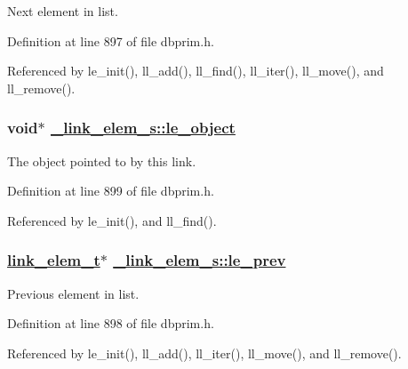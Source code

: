 Next element in list. 

Definition at line 897 of file dbprim.h.

Referenced by le\_\-init(), ll\_\-add(), ll\_\-find(), ll\_\-iter(), ll\_\-move(), and ll\_\-remove().\hypertarget{struct__link__elem__s_o3}{
\subsubsection[le\_\-object]{\setlength{\rightskip}{0pt plus 5cm}void$\ast$ \hyperlink{struct__link__elem__s_o3}{\_\-link\_\-elem\_\-s::le\_\-object}}}
\label{struct__link__elem__s_o3}


The object pointed to by this link. 

Definition at line 899 of file dbprim.h.

Referenced by le\_\-init(), and ll\_\-find().\hypertarget{struct__link__elem__s_o2}{
\subsubsection[le\_\-prev]{\setlength{\rightskip}{0pt plus 5cm}\hyperlink{struct__link__elem__s}{link\_\-elem\_\-t}$\ast$ \hyperlink{struct__link__elem__s_o2}{\_\-link\_\-elem\_\-s::le\_\-prev}}}
\label{struct__link__elem__s_o2}


Previous element in list. 

Definition at line 898 of file dbprim.h.

Referenced by le\_\-init(), ll\_\-add(), ll\_\-iter(), ll\_\-move(), and ll\_\-remove().